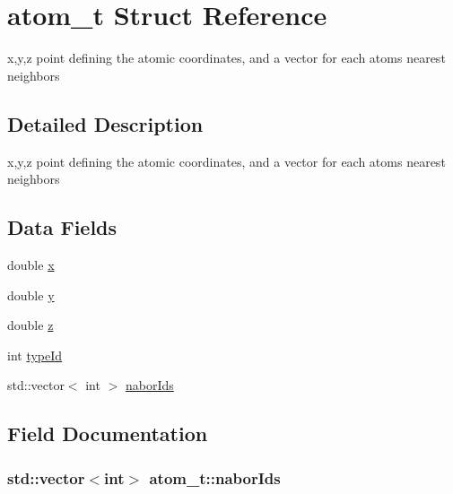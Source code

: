 \hypertarget{structatom__t}{}\section{atom\+\_\+t Struct Reference}
\label{structatom__t}


x,y,z point defining the atomic coordinates, and a vector for each atoms nearest neighbors  




\subsection{Detailed Description}
x,y,z point defining the atomic coordinates, and a vector for each atoms nearest neighbors \subsection*{Data Fields}
\begin{DoxyCompactItemize}
\item 
double \hyperlink{structatom__t_a6e538461d4eb4f74334e8bb9bce8dd3b}{x}
\item 
double \hyperlink{structatom__t_ad4c2c5483ce89ba93612319024416799}{y}
\item 
double \hyperlink{structatom__t_ab5db012f5e76e4e211b6cdb714cd4f2c}{z}
\item 
int \hyperlink{structatom__t_ac5653f17c6bcb3203b1c1911cd88c4bf}{type\+Id}
\item 
std\+::vector$<$ int $>$ \hyperlink{structatom__t_ab2a13b0a7d16764f6b568848717b3bcb}{nabor\+Ids}
\end{DoxyCompactItemize}


\subsection{Field Documentation}
\hypertarget{structatom__t_ab2a13b0a7d16764f6b568848717b3bcb}{}
\subsubsection[{nabor\+Ids}]{\setlength{\rightskip}{0pt plus 5cm}std\+::vector$<$int$>$ atom\+\_\+t\+::nabor\+Ids}\label{structatom__t_ab2a13b0a7d16764f6b568848717b3bcb}
\hypertarget{structatom__t_ac5653f17c6bcb3203b1c1911cd88c4bf}{}
